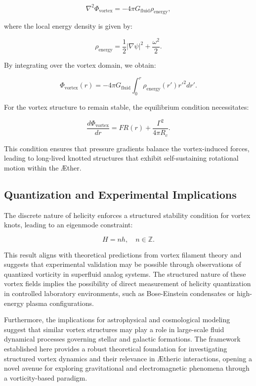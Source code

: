 \begin{equation}
\nabla^2 \Phi_{\text{vortex}} = -4\pi G_{\text{fluid}} \rho_{\text{energy}},
\end{equation}

where the local energy density is given by:

\begin{equation}
\rho_{\text{energy}} = \frac{1}{2} |\nabla \psi|^2 + \frac{\omega^2}{2}.
\end{equation}

By integrating over the vortex domain, we obtain:

\begin{equation}
\Phi_{\text{vortex}}(r) = -4\pi G_{\text{fluid}} \int_0^r \rho_{\text{energy}}(r') r'^2 dr'.
\end{equation}

For the vortex structure to remain stable, the equilibrium condition necessitates:

\begin{equation}
\frac{d\Phi_{\text{vortex}}}{dr} = F R(r) + \frac{\Gamma^2}{4 \pi R_c}.
\end{equation}

This condition ensures that pressure gradients balance the vortex-induced forces, leading to long-lived knotted structures that exhibit self-sustaining rotational motion within the \AE ther.

\subsection{Quantization and Experimental Implications}
The discrete nature of helicity enforces a structured stability condition for vortex knots, leading to an eigenmode constraint:

\begin{equation}
H = n h, \quad n \in \mathbb{Z}.
\end{equation}

This result aligns with theoretical predictions from vortex filament theory and suggests that experimental validation may be possible through observations of quantized vorticity in superfluid analog systems. The structured nature of these vortex fields implies the possibility of direct measurement of helicity quantization in controlled laboratory environments, such as Bose-Einstein condensates or high-energy plasma configurations.

Furthermore, the implications for astrophysical and cosmological modeling suggest that similar vortex structures may play a role in large-scale fluid dynamical processes governing stellar and galactic formations. The framework established here provides a robust theoretical foundation for investigating structured vortex dynamics and their relevance in \AE theric interactions, opening a novel avenue for exploring gravitational and electromagnetic phenomena through a vorticity-based paradigm.




